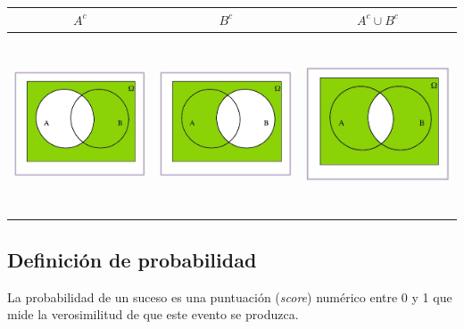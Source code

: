 \documentclass[]{book}
\begin{document}
\begin{longtable}[]{@{}ccc@{}}
\toprule
\(A^c\) & \(B^c\) & \(A^c\cup B^c\)\tabularnewline
\midrule
\endhead
\includegraphics[width=\textwidth,height=2.08333in]{Images/proba1dibujos/demorgan3.jpg} & \includegraphics[width=\textwidth,height=2.08333in]{Images/proba1dibujos/demorgan5.jpg} & \includegraphics[width=\textwidth,height=2.08333in]{Images/proba1dibujos/demorgan4.jpg}\tabularnewline
\bottomrule
\end{longtable}

\hypertarget{definiciuxf3n-de-probabilidad}{%
\subsection{Definición de probabilidad}\label{definiciuxf3n-de-probabilidad}}

La probabilidad de un suceso es una puntuación (\emph{score}) numérico entre 0 y 1 que mide la verosimilitud de que este evento se produzca.
\end{document}
